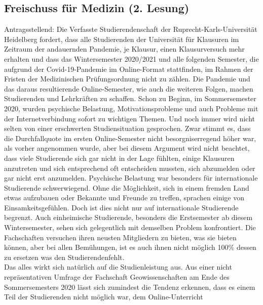     \subsection{Freischuss für Medizin \label{corona:6} (2. Lesung)}
    Antragsstellend: 
        Die Verfasste Studierendenschaft der Ruprecht-Karls-Universität Heidelberg fordert,
        dass alle
        Studierenden der Universität für Klausuren im Zeitraum der andauernden Pandemie, je
        Klausur, einen Klausurversuch mehr erhalten und dass das Wintersemester 2020/2021
        und alle
        folgenden Semester, die aufgrund der Covid-19-Pandemie im Online-Format stattfinden,
        im
        Rahmen der Fristen der Medizinischen Prüfungsordnung nicht zu zählen.
        Die Pandemie und das daraus resultierende Online-Semester, wie auch die weiteren Folgen, machen
        Studierenden und Lehrkräften zu schaffen. Schon zu Beginn, im Sommersemester 2020, wurden
        psychische Belastung, Motivationsprobleme und auch Probleme mit der Internetverbindung sofort
        zu wichtigen Themen. Und noch immer wird nicht selten von einer erschwerten Studiensituation
        gesprochen. Zwar stimmt es, dass die Durchfallquote im ersten Online-Semester nicht
        besorgniserregend höher war, als vorher angenommen wurde, aber bei diesem Argument wird nicht
        beachtet, dass viele Studierende sich gar nicht in der Lage fühlten, einige Klausuren anzutreten und
        sich entsprechend oft entscheiden mussten, sich abzumelden oder gar nicht erst anzumelden.
        Psychische Belastung war besonders für internationale Studierende schwerwiegend. Ohne die
        Möglichkeit, sich in einem fremden Land etwas aufzubauen oder Bekannte und Freunde zu treffen,
        sprachen einige von Einsamkeitsgefühlen. Doch ist dies nicht nur auf internationale Studierende
        begrenzt. Auch einheimische Studierende, besonders die Erstsemester ab diesem Wintersemester,
        sehen sich gelegentlich mit demselben Problem konfrontiert. Die Fachschaften versuchen ihren
        neusten Mitgliedern zu bieten, was sie bieten können, aber bei allen Bemühungen, ist es auch ihnen
        nicht möglich 100\% dessen zu ersetzen was den Studierendenfehlt.\\
        Das alles wirkt sich natürlich auf die Studienleistung aus. Aus einer nicht repräsentativen Umfrage
        der Fachschaft Geowissenschaften am Ende des Sommersemesters 2020 lässt sich zumindest die
        Tendenz erkennen, dass es einem Teil der Studierenden nicht möglich war, dem Online-Unterricht
